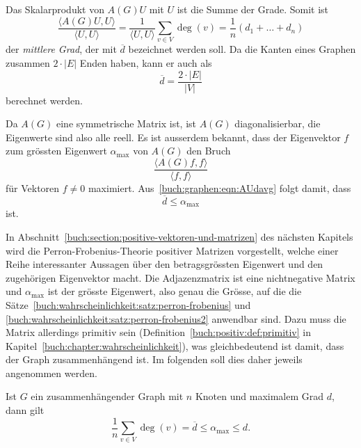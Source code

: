 Das Skalarprodukt von $A(G)U$ mit $U$ ist die Summe der Grade.
Somit ist
\begin{equation}
\frac{\langle A(G)U,U\rangle}{\langle U,U\rangle}
=
\frac{1}{\langle U,U\rangle}\sum_{v\in V}\deg(v)
=
\frac{1}{n}(d_1+\dots+d_n)
\label{buch:graphen:eqn:AUdavg}
\end{equation}
der {\em mittlere Grad}, der mit $\overline{d}$ bezeichnet werden soll.
Da die Kanten eines Graphen zusammen $2\cdot|E|$ Enden haben, kann
er auch als
\[
\overline{d}=\frac{2\cdot|E|}{|V|}
\]
berechnet werden.
%

Da $A(G)$ eine symmetrische Matrix ist, ist $A(G)$ diagonalisierbar,
die Eigenwerte sind also alle reell.
Es ist ausserdem bekannt, dass der Eigenvektor $f$ zum grössten Eigenwert
$\alpha_{\text{max}}$ von $A(G)$
den Bruch
\[
\frac{\langle A(G)f,f\rangle}{\langle f,f\rangle}
\]
für Vektoren $f\ne 0$ maximiert.
Aus~\eqref{buch:graphen:eqn:AUdavg} folgt damit, dass
\begin{equation}
\overline{d}
\le
\alpha_{\text{max}}
\label{buch:graphen:eqn:dqueramax}
\end{equation}
ist.

In Abschnitt~\ref{buch:section:positive-vektoren-und-matrizen}
des nächsten Kapitels wird die Perron-Frobenius-Theorie positiver
%
%
Matrizen vorgestellt, welche einer Reihe interessanter Aussagen
über den betragsgrössten Eigenwert und den zugehörigen Eigenvektor
macht.
Die Adjazenzmatrix ist eine nichtnegative Matrix und $\alpha_{\text{max}}$
ist der grösste Eigenwert, also genau die Grösse, auf die die
Sätze~\ref{buch:wahrscheinlichkeit:satz:perron-frobenius}
und \ref{buch:wahrscheinlichkeit:satz:perron-frobenius2}
anwendbar sind.
Dazu muss die Matrix allerdings primitiv sein
(Definition~\ref{buch:positiv:def:primitiv} in Kapitel~\ref{buch:chapter:wahrscheinlichkeit}),
was gleichbedeutend
%
ist damit, dass der Graph zusammenhängend ist.
Im folgenden soll dies daher jeweils angenommen werden.

\begin{satz}
Ist $G$ ein zusammenhängender Graph mit $n$ Knoten und maximalem Grad $d$,
dann gilt
\[
\frac1n\sum_{v\in V} \deg(v) 
=
\overline{d}
\le \alpha_{\text{max}} \le d.
\]
\end{satz}

